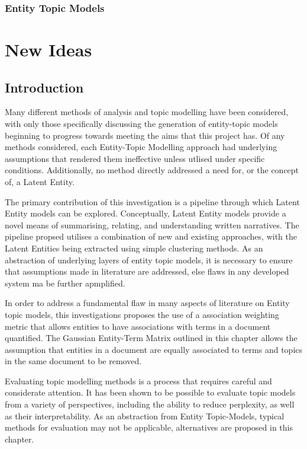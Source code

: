 \documentclass[10pt]{report}
\begin{document}
\subsection{Entity Topic Models}



%
%
%
%
\chapter{New Ideas}
\section{Introduction}
Many different methods of analysis and topic modelling have been considered, with only those specifically discussing the generation of entity-topic models beginning to progress towards meeting the aims that this project has. Of any methods considered, each Entity-Topic Modelling approach had underlying assumptions that rendered them ineffective unless utlised under specific conditions. Additionally, no method directly addressed a need for, or the concept of, a Latent Entity.

The primary contribution of this investigation is a pipeline through which Latent Entity models can be explored. Conceptually, Latent Entity models provide a novel means of summarising, relating, and understanding written narratives. The pipeline propsed utilises a combination of new and existing approaches, with the Latent Entities being extracted using simple clustering methods. As an abstraction of underlying layers of entity topic models, it is necessary to ensure that assumptions made in literature are addressed, else flaws in any developed system ma be further apmplified.

In order to address a fundamental flaw in many aspects of literature on Entity topic models, this investigations proposes the use of a association weighting metric that allows entities to have associations with terms in a document quantified. The Gaussian Entity-Term Matrix outlined in this chapter allows the assumption that entities in a document are equally associated to terms and topics in the same document to be removed.

Evaluating topic modelling methods is a process that requires careful and considerate attention. It has been shown to be possible to evaluate topic models from a variety of perspectives, including the ability to reduce perplexity, as well as their interpretability. As an abstraction from Entity Topic-Models, typical methods for evaluation may not be applicable, alternatives are proposed in this chapter.
\end{document}

